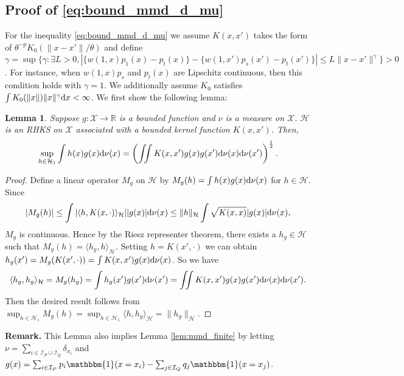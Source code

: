 \documentclass[12pt]{article}
\newtheorem{lemma}{Lemma}
\newcommand{\ind}{\mathbbm{1}}
\begin{document}
\subsection{Proof of \eqref{eq:bound_mmd_d_mu}}
\label{sec:pf_bound_mmd_d_mu}
For the inequality \eqref{eq:bound_mmd_d_mu} we assume $K(x, x')$ takes the form of $\theta^{-p} K_0(\|x-x'\| / \theta)$ and define $\gamma = \sup\{\gamma: \exists L>0, |\{w(1, x)p_1(x) - p_t(x)\} - \{w(1, x')p_s(x') - p_t(x')\}| \le L\|x-x'\|^\gamma\} > 0$. For instance, when $w(1, x)p_s$ and $p_t(x)$ are Lipschitz continuous, then this condition holds with $\gamma = 1$. We additionally assume $K_0$ satisfies $\int K_0(\|x\|) \|x\|^\gamma \textnormal{d} x < \infty$. We first show the following lemma:
\begin{lemma}
	\label{lem:mmd_compute}
	Suppose $g:\mathcal{X} \rightarrow \mathbb{R}$ is a bounded function and $\nu$ is a measure on $\mathcal{X}$. $\mathcal{H}$ is an RHKS on $\mathcal{X}$ associated with a bounded kernel function $K(x, x')$. Then,
	\begin{equation*}
		\sup_{h \in \mathcal{H}_1}
		\int h(x) g(x) \textnormal{d} \nu(x)
		=
		\left( \iint K(x, x') g(x) g(x') \textnormal{d} \nu(x) \textnormal{d} \nu(x') \right)^{\frac{1}{2}}
		.\end{equation*}
\end{lemma}
\begin{proof}
	Define a linear operator $M_g$ on $\mathcal{H}$ by 
	$M_g(h) = \int h(x) g(x) \textnormal{d} \nu(x)$ for $h \in \mathcal{H}$. Since
	\begin{equation*}
		|M_g(h)| 
		\le
		\int |\langle h, K(x, \cdot) \rangle_\mathcal{H}| |g(x)| \textnormal{d} \nu(x)
		\le
		\| h \|_\mathcal{H} \int \sqrt{K(x, x)} |g(x)| \textnormal{d} \nu(x)
		,\end{equation*}
	$M_g$ is continuous. Hence by the Riesz representer theorem, there exists a $h_g \in \mathcal{H}$ such that $M_g(h) = \langle h_g, h \rangle_\mathcal{H}$. Setting $h = K(x', \cdot)$ we can obtain
	$h_g(x') = M_g( K(x', \cdot) ) = \int K(x, x') g(x) \textnormal{d} \nu(x)$.
	So we have
	\begin{equation*}
		\langle h_g, h_g \rangle_\mathcal{H} =
		M_g(h_g) =
		\int h_g(x') g(x') \textnormal{d} \nu(x') =
		\iint K(x, x') g(x) g(x') \textnormal{d} \nu(x) \textnormal{d} \nu(x')
		.\end{equation*}
	Then the desired result follows from
	$
	\sup_{h \in \mathcal{H}_1} M_g(h) = 
	\sup_{h \in \mathcal{H}_1} \langle h, h_g \rangle_\mathcal{H} = 
	\| h_g \|_\mathcal{H}
	$.
\end{proof}
\noindent\textbf{Remark.}
This Lemma also implies Lemma \ref{lem:mmd_finite} by letting $\nu = \sum_{i \in \mathcal{I}_P \cup \mathcal{I}_Q} \delta_{x_i}$ and $g(x) = \sum_{i \in \mathcal{I}_P}p_i \ind(x = x_i) - \sum_{j \in \mathcal{I}_Q}q_j \ind(x = x_j)$. 
\end{document}
